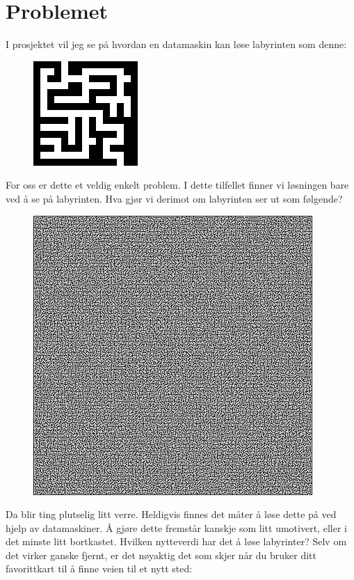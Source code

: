 \documentclass[a5paper]{article}
\begin{document}
\section*{Problemet}
I prosjektet vil jeg se på hvordan en datamaskin kan løse labyrinten som denne:
\begin{figure}[H]
    \centering
    \includegraphics{liten_labyrint_forstor.png}
\end{figure}
For oss er dette et veldig enkelt problem. I dette tilfellet finner vi løsningen bare ved å se på labyrinten. Hva gjør vi derimot om labyrinten ser ut som følgende?
\begin{figure}[H]
    \centering
    \includegraphics[scale=0.6]{combo400.png}
\end{figure}
Da blir ting plutselig litt verre. Heldigvis finnes det måter å løse dette på ved hjelp av datamaskiner. Å gjøre dette fremstår kanskje som litt umotivert, eller i det minste litt bortkastet. Hvilken nytteverdi har det å løse labyrinter? Selv om det virker ganske fjernt, er det nøyaktig det som skjer når du bruker ditt favorittkart til å finne veien til et nytt sted:
\end{document}
